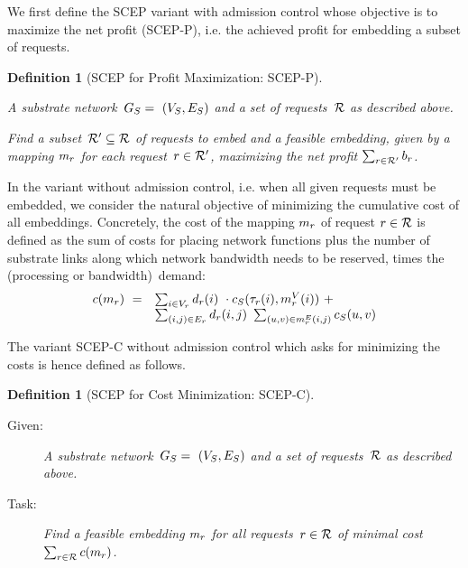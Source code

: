 \documentclass[10pt, conference, letterpaper]{IEEEtran}
\newtheorem{definition}[theorem]{Definition}
\begin{document}
We first define the SCEP variant with admission control whose objective is to maximize the net profit (SCEP-P), i.e. the achieved profit for embedding a subset of requests.  

\begin{definition}[SCEP for Profit Maximization: SCEP-P]~\\[-12pt]
\begin{description}
\label{def:scep-with-admission-control}
\item[Given:] A substrate network~$G_S =~(V_S,E_S)$ and a set of requests~$\mathcal{R}$ as described above.
\item[Task:] Find a subset~$\mathcal{R}' \subseteq \mathcal{R}$ of requests to embed and a feasible embedding, given by a mapping $m_{r}$ for each request~$r \in \mathcal{R}'$, maximizing the net profit $\sum_{r \in \mathcal{R}'} b_{r}$.
\end{description}
\end{definition}

In the variant without admission control, i.e. when all given requests must be embedded, we consider the natural objective of minimizing the cumulative cost of all embeddings. Concretely, the cost of the mapping $m_{r}$ of request $r \in \mathcal{R}$ is defined as the sum of costs for placing network functions
 plus the number of substrate links along which network bandwidth 
 needs to be reserved, times the (processing or bandwidth)~demand:
\begin{alignat}{1}
\label{eq:cost-definition}
\begin{array}{rl}
c(m_{r})~= & \sum_{i \in V_{r}} d_{r}(i)~\cdot c_{S}(\tau_{r}(i), m^V_{r}(i))~+ \\
          & \sum_{(i,j) \in  E_{r}} d_{r}(i,j)~\sum_{(u,v) \in  m^E_{r}(i,j)} c_{S}(u,v)
\end{array}
\end{alignat}

The variant SCEP-C without admission control which asks for minimizing the costs is hence defined as follows.

\begin{definition}[SCEP for Cost Minimization: SCEP-C]~\\[-12pt]
\label{def:scep-without-admission-control}
\begin{description}
\item[Given:] A substrate network~$G_S =~(V_S,E_S)$ and a set of requests~$\mathcal{R}$ as described above.
\item[Task:] Find a feasible embedding $m_{r}$ for all requests~$r \in \mathcal{R}$ of minimal cost~$\sum_{r \in \mathcal{R}} c(m_{r})$.
\end{description}
\end{definition}
\end{document}
